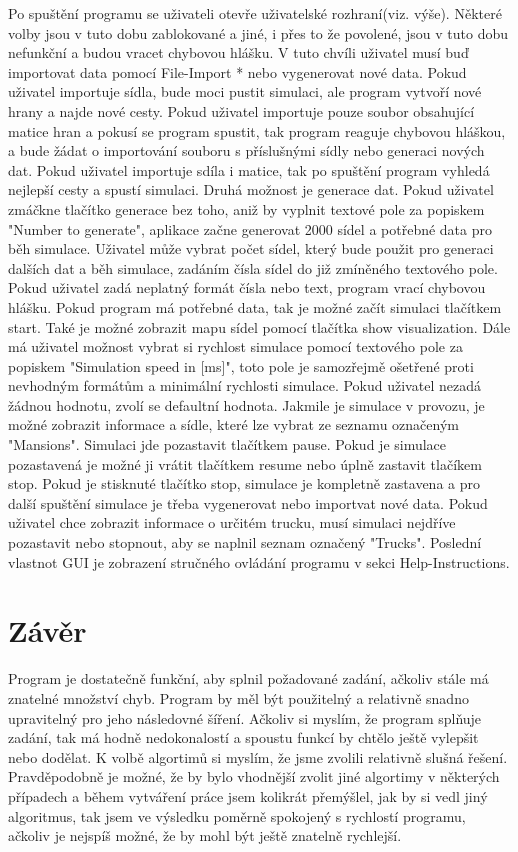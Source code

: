 \documentclass[ 12pt, a4paper]{article}
\begin{document}
Po spuštění programu se uživateli otevře uživatelské rozhraní(viz. výše). Některé volby jsou v tuto dobu zablokované a jiné, i přes to že povolené, jsou v tuto dobu nefunkční a budou vracet chybovou hlášku.\newpage
 V tuto chvíli uživatel musí buď importovat data pomocí File-Import * nebo vygenerovat nové data. Pokud uživatel importuje sídla, bude moci pustit simulaci, ale program vytvoří nové hrany a najde nové cesty. Pokud uživatel importuje pouze soubor obsahující matice hran a pokusí se program spustit, tak program reaguje chybovou hláškou, a bude žádat o importování souboru s příslušnými sídly nebo generaci nových dat. Pokud uživatel importuje sdíla i matice, tak po spuštění program vyhledá nejlepší cesty a spustí simulaci. Druhá možnost je generace dat. Pokud uživatel zmáčkne tlačítko generace bez toho, aniž by vyplnit textové pole za popiskem "Number to generate", aplikace začne generovat 2000 sídel a potřebné data pro běh simulace. Uživatel může vybrat počet sídel, který bude použit pro generaci dalších dat a běh simulace, zadáním čísla sídel do již zmíněného textového pole. Pokud uživatel zadá neplatný formát čísla nebo text, program vrací chybovou hlášku.\newline
Pokud program má potřebné data, tak je možné začít simulaci tlačítkem start. Také je možné zobrazit mapu sídel pomocí tlačítka show visualization. Dále má uživatel možnost vybrat si rychlost simulace pomocí textového pole za popiskem "Simulation speed in [ms]", toto pole je samozřejmě ošetřené proti nevhodným formátům a minimální rychlosti simulace. Pokud uživatel nezadá žádnou hodnotu, zvolí se defaultní hodnota. Jakmile je simulace v provozu, je možné zobrazit informace a sídle, které lze vybrat ze seznamu označeným "Mansions". Simulaci jde pozastavit tlačítkem pause. Pokud je simulace pozastavená je možné ji vrátit tlačítkem resume nebo úplně zastavit tlačíkem stop. Pokud je stisknuté tlačítko stop, simulace je kompletně zastavena a pro další spuštění simulace je třeba vygenerovat nebo importvat nové data. Pokud uživatel chce zobrazit informace o určitém trucku, musí simulaci nejdříve pozastavit nebo stopnout, aby se naplnil seznam označený "Trucks". Poslední vlastnot GUI je zobrazení stručného ovládání programu v sekci Help-Instructions.
\newpage
%
%
\section{Závěr}
Program je dostatečně funkční, aby splnil požadované zadání, ačkoliv stále má znatelné množství chyb. Program by měl být použitelný a relativně snadno upravitelný pro jeho následovné šíření. Ačkoliv si myslím, že program splňuje zadání, tak má hodně nedokonalostí a spoustu funkcí by chtělo ještě vylepšit nebo dodělat.
K volbě algortimů si myslím, že jsme zvolili relativně slušná řešení. Pravděpodobně je možné, že by bylo vhodnější zvolit jiné algortimy v některých případech a během vytváření práce jsem kolikrát přemýšlel, jak by si vedl jiný algoritmus, tak jsem ve výsledku poměrně spokojený s rychlostí programu, ačkoliv je nejspíš možné, že by mohl být ještě znatelně rychlejší.
\end{document}
